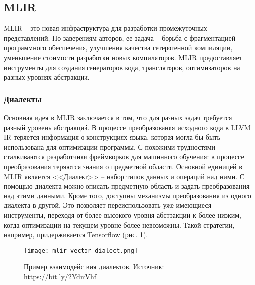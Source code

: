 \subsection{MLIR}
MLIR -- это новая инфраструктура для разработки промежуточных представлений.
По заверениям авторов, ее задача -- борьба с фрагментацией программного
обеспечения, улучшения качества гетерогенной компиляции, уменьшение стоимости
разработки новых компиляторов. MLIR предоставляет инструменты для создания
генераторов кода, трансляторов, оптимизаторов на разных уровнях абстракции\cite{Lattner2020}.
\subsubsection{Диалекты}
Основная идея в MLIR заключается в том, что для разных задач требуется разный
уровень абстракций. В процессе преобразования исходного кода в LLVM IR теряется
информация о конструкциях языка, которая могла бы быть использована для
оптимизации программы. С похожими трудностями сталкиваются разработчики
фреймворков для машинного обучения: в процессе преобразования теряются знания
о предметной области. Основной единицей в MLIR является <<Диалект>> -- набор
типов данных и операций над ними. С помощью диалекта можно описать предметную
область и задать преобразования над этими данными. Кроме того, доступны
механизмы преобразования из одного диалекта в другой. Это позволяет
переиспользовать уже имеющиеся инструменты, переходя от более высокого уровня
абстракции к более низким, когда оптимизации на текущем уровне более невозможны.
Такой стратегии, например, придерживается Tensorflow (рис. \ref{fig:tf_dialects}).
\begin{figure}[h]
    \centering
    \texttt{[image: mlir\_vector\_dialect.png]}
    \caption{Пример взаимодействия диалектов. Источник: https://bit.ly/2YdmVhf
    }
    \label{fig:tf_dialects}
\end{figure}
